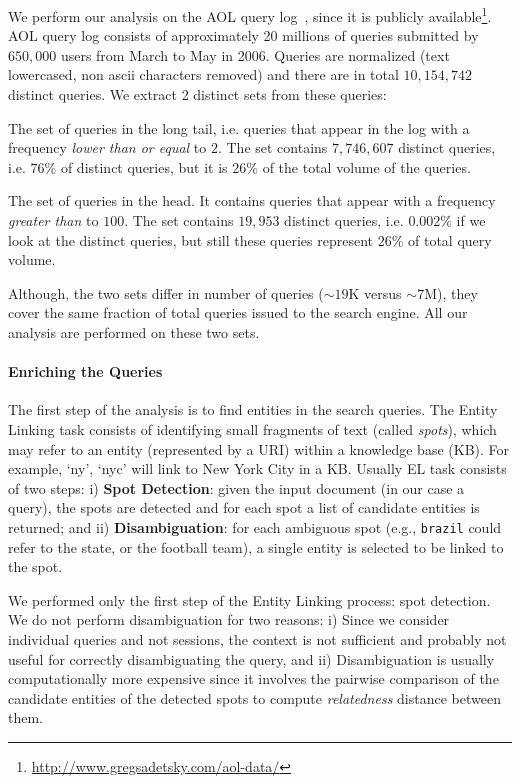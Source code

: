 We perform our analysis on the AOL query log~\cite{pass2006picture}, since it is publicly available\footnote{\url{http://www.gregsadetsky.com/aol-data/}}. AOL query log consists of approximately 20 millions of queries submitted by $650,000$ users from March to May in 2006. Queries are normalized (text lowercased, non ascii characters removed) and there are in total $10,154,742$ distinct queries. 
We extract 2 distinct sets from these queries: 
\begin{description}
	\item{\tail{}} The set of queries in the long tail, i.e. queries that appear in the log with a frequency \emph{lower than or equal} to $2$. The set contains $7,746,607$ distinct queries, i.e. $76\%$ of distinct queries, but it is $26\%$ of the total volume of the queries.
	\item{\head{}} The set of queries in the head. It contains queries that appear with a frequency \emph{greater than} to $100$. The set contains $19,953$ distinct queries, i.e. $0.002\%$ if we look at the distinct queries, but still these queries represent $26\%$ of total query volume.%
\end{description}
Although, the two sets differ in number of queries ($\sim19$K versus $\sim7$M), they cover the same fraction of total queries issued to the search engine. All our analysis are performed on these two sets.

\paragraph{Enriching the Queries}
The first step of the analysis is to find entities in the search queries.  
The Entity Linking task consists of identifying small fragments of text (called \emph{spots}), which may refer to an entity (represented by a URI) within a knowledge base (KB). For example, `ny', `nyc' will link to New York City in a KB. 
Usually EL task consists of two steps: i) \textbf{Spot Detection}: given the input document (in our case a query), 
the spots are detected and for each spot a list of candidate entities is returned; and ii) \textbf{Disambiguation}:
for each ambiguous spot (e.g., \texttt{brazil} could refer to the state, or the football team), a single entity is 
selected to be linked to the spot.

We performed only the first step of the Entity Linking process: spot detection. 
We do not perform disambiguation for two reasons: i) Since we consider individual queries and not sessions, the context is not sufficient and probably not useful for correctly disambiguating the query, and ii) Disambiguation is usually computationally more expensive
since it involves the pairwise comparison of the candidate entities of the detected spots to compute \emph{relatedness}\cite{milne2008learning} distance between them.

